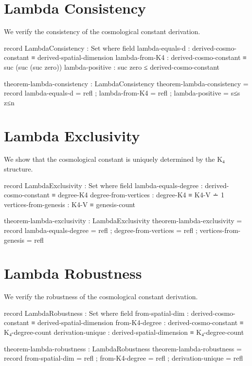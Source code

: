 \documentclass[11pt,a4paper]{book}
\begin{document}
\section{Lambda Consistency}

We verify the consistency of the cosmological constant derivation.

\begin{code}
record LambdaConsistency : Set where
  field
    lambda-equals-d     : derived-cosmo-constant ≡ derived-spatial-dimension
    lambda-from-K4      : derived-cosmo-constant ≡ suc (suc (suc zero))
    lambda-positive     : suc zero ≤ derived-cosmo-constant

theorem-lambda-consistency : LambdaConsistency
theorem-lambda-consistency = record
  { lambda-equals-d = refl
  ; lambda-from-K4  = refl
  ; lambda-positive = s≤s z≤n
  }
\end{code}

\section{Lambda Exclusivity}

We show that the cosmological constant is uniquely determined by the K₄ structure.

\begin{code}
record LambdaExclusivity : Set where
  field
    lambda-equals-degree : derived-cosmo-constant ≡ degree-K4
    degree-from-vertices : degree-K4 ≡ K4-V ∸ 1
    vertices-from-genesis : K4-V ≡ genesis-count

theorem-lambda-exclusivity : LambdaExclusivity
theorem-lambda-exclusivity = record
  { lambda-equals-degree = refl
  ; degree-from-vertices = refl
  ; vertices-from-genesis = refl
  }
\end{code}

\section{Lambda Robustness}

We verify the robustness of the cosmological constant derivation.

\begin{code}
record LambdaRobustness : Set where
  field
    from-spatial-dim   : derived-cosmo-constant ≡ derived-spatial-dimension
    from-K4-degree     : derived-cosmo-constant ≡ K₄-degree-count
    derivation-unique  : derived-spatial-dimension ≡ K₄-degree-count

theorem-lambda-robustness : LambdaRobustness
theorem-lambda-robustness = record
  { from-spatial-dim  = refl
  ; from-K4-degree    = refl
  ; derivation-unique = refl
  }
\end{code}
\end{document}
